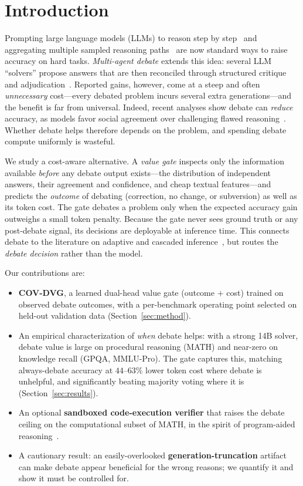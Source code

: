 \documentclass[conference]{IEEEtran}
\begin{document}
\section{Introduction}
Prompting large language models (LLMs) to reason step by step~\cite{wei2022cot} and
aggregating multiple sampled reasoning paths~\cite{wang2023selfcons,li2024moreagents}
are now standard ways to raise accuracy on hard tasks. \emph{Multi-agent debate}
extends this idea: several LLM ``solvers'' propose answers that are then reconciled
through structured critique and adjudication~\cite{du2024debate,liang2024mad,
wang2024moa}. Reported gains, however, come at a steep and often \emph{unnecessary}
cost---every debated problem incurs several extra generations---and the benefit is
far from universal. Indeed, recent analyses show debate can \emph{reduce} accuracy,
as models favor social agreement over challenging flawed
reasoning~\cite{wynn2025failure}. Whether debate helps therefore depends on the
problem, and spending debate compute uniformly is wasteful.

We study a cost-aware alternative. A \emph{value gate} inspects only the information
available \emph{before} any debate output exists---the distribution of independent
answers, their agreement and confidence, and cheap textual features---and predicts
the \emph{outcome} of debating (correction, no change, or subversion) as well as its
token cost. The gate debates a problem only when the expected accuracy gain outweighs
a small token penalty. Because the gate never sees ground truth or any post-debate
signal, its decisions are deployable at inference time. This connects debate to the
literature on adaptive and cascaded inference~\cite{chen2023frugalgpt}, but routes
the \emph{debate decision} rather than the model.

Our contributions are:
\begin{itemize}
\item \textbf{COV-DVG}, a learned dual-head value gate (outcome $+$ cost) trained on
observed debate outcomes, with a per-benchmark operating point selected on held-out
validation data (Section~\ref{sec:method}).
\item An empirical characterization of \emph{when} debate helps: with a strong 14B
solver, debate value is large on procedural reasoning (MATH) and near-zero on
knowledge recall (GPQA, MMLU-Pro). The gate captures this, matching always-debate
accuracy at $44$--$63\%$ lower token cost where debate is unhelpful, and
significantly beating majority voting where it is (Section~\ref{sec:results}).
\item An optional \textbf{sandboxed code-execution verifier} that raises the debate
ceiling on the computational subset of MATH, in the spirit of program-aided
reasoning~\cite{gao2023pal,chen2023pot}.
\item A cautionary result: an easily-overlooked \textbf{generation-truncation}
artifact can make debate appear beneficial for the wrong reasons; we quantify it and
show it must be controlled for.
\end{itemize}
\end{document}
